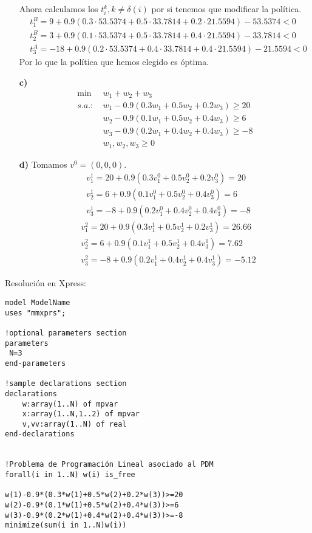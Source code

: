 \documentclass[twoside]{article}
\begin{document}
\begin{ejercicio}{3}
\begin{solucion}
\begin{itemize}
Ahora calculamos los $t_i^k, k\neq\delta(i)$ por si tenemos que modificar la política. 
\begin{align*}
&t_1^B=9+0.9(0.3\cdot 53.5374 +0.5\cdot 33.7814+0.2\cdot 21.5594)-53.5374<0\\
&t_2^B=3+0.9(0.1\cdot 53.5374+0.5\cdot  33.7814+0.4\cdot 21.5594)-33.7814<0\\
&t_3^A=-18+0.9(0.2\cdot 53.5374+ 0.4\cdot 33.7814+ 0.4\cdot 21.5594)-21.5594<0
\end{align*}
Por lo que la política que hemos elegido es óptima.
\item[\textbf{c)}]
\begin{align*}
\min\ & w_1+w_2+w_3\\
s.a.:\ & w_1-0.9(0.3w_1+0.5w_2+0.2w_3)\geq 20\\
       & w_2-0.9(0.1w_1+0.5w_2+0.4w_3)\geq 6\\
       & w_3-0.9(0.2w_1+0.4w_2+0.4w_3)\geq -8\\
       & w_1,w_2,w_3\geq 0
\end{align*}
\item[\textbf{d)}] Tomamos $v^0=(0,0,0)$.
\begin{align*}
&v^1_1=20+0.9(0.3v^0_1+0.5v^0_2+0.2v^0_3)=20\\
&  v^1_2=6+0.9(0.1v^0_1+0.5v^0_2+0.4v^0_3)=6\\
&  v^1_3=-8+0.9(0.2v^0_1+0.4v^0_2+0.4v^0_3)=-8
\end{align*} 
\begin{align*}
&v^2_1=20+0.9(0.3v^1_1+0.5v^1_2+0.2v^1_3)=26.66\\
&  v^2_2=6+0.9(0.1v^1_1+0.5v^1_2+0.4v^1_3)=7.62\\
&  v^2_3=-8+0.9(0.2v^1_1+0.4v^1_2+0.4v^1_3)=-5.12
\end{align*}
\end{itemize}

Resolución en Xpress:
\begin{verbatim}
model ModelName
uses "mmxprs"; 

!optional parameters section
parameters
 N=3
end-parameters

!sample declarations section
declarations
	w:array(1..N) of mpvar
	x:array(1..N,1..2) of mpvar
	v,vv:array(1..N) of real
end-declarations


!Problema de Programación Lineal asociado al PDM
forall(i in 1..N) w(i) is_free

w(1)-0.9*(0.3*w(1)+0.5*w(2)+0.2*w(3))>=20
w(2)-0.9*(0.1*w(1)+0.5*w(2)+0.4*w(3))>=6
w(3)-0.9*(0.2*w(1)+0.4*w(2)+0.4*w(3))>=-8
minimize(sum(i in 1..N)w(i))



\end{verbatim}
\end{solucion}
\end{ejercicio}
\end{document}

